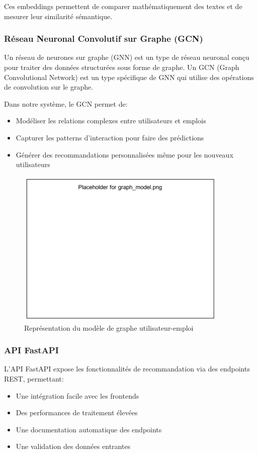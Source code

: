\documentclass[12pt,a4paper]{article}
\begin{document}
Ces embeddings permettent de comparer mathématiquement des textes et de mesurer leur similarité sémantique.

\subsubsection{Réseau Neuronal Convolutif sur Graphe (GCN)}

\begin{definitionbox}[title=Graphe Neural Network]
Un réseau de neurones sur graphe (GNN) est un type de réseau neuronal conçu pour traiter des données structurées sous forme de graphe. Un GCN (Graph Convolutional Network) est un type spécifique de GNN qui utilise des opérations de convolution sur le graphe.
\end{definitionbox}

Dans notre système, le GCN permet de:
\begin{itemize}
    \item Modéliser les relations complexes entre utilisateurs et emplois
    \item Capturer les patterns d'interaction pour faire des prédictions
    \item Générer des recommandations personnalisées même pour les nouveaux utilisateurs
\end{itemize}

\begin{figure}[H]
    \centering
    \includegraphics[width=0.9\textwidth]{images/graph_model.png}
    \caption{Représentation du modèle de graphe utilisateur-emploi}
    \label{fig:graph}
\end{figure}

\subsubsection{API FastAPI}
L'API FastAPI expose les fonctionnalités de recommandation via des endpoints REST, permettant:
\begin{itemize}
    \item Une intégration facile avec les frontends
    \item Des performances de traitement élevées
    \item Une documentation automatique des endpoints
    \item Une validation des données entrantes
\end{itemize}
\end{document}
